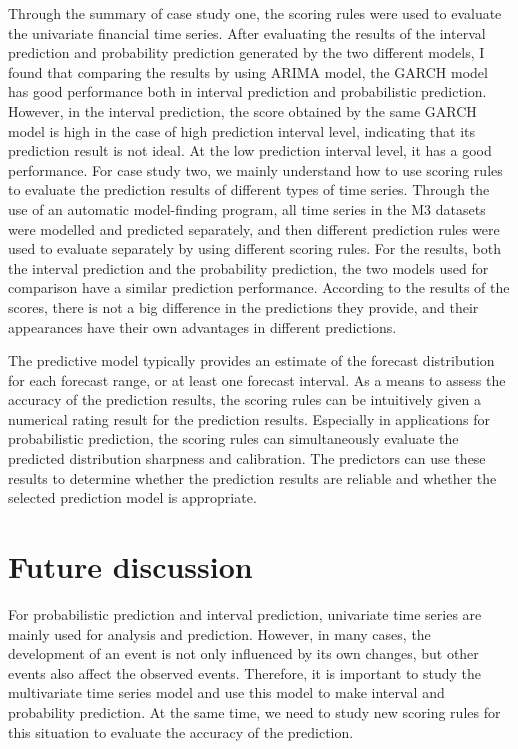 \documentclass{monashthesis}
\theoremstyle{definition}
\theoremstyle{definition}
\theoremstyle{definition}
\theoremstyle{remark}
\begin{document}
Through the summary of case study one, the scoring rules were used to
evaluate the univariate financial time series. After evaluating the
results of the interval prediction and probability prediction generated
by the two different models, I found that comparing the results by using
ARIMA model, the GARCH model has good performance both in interval
prediction and probabilistic prediction. However, in the interval
prediction, the score obtained by the same GARCH model is high in the
case of high prediction interval level, indicating that its prediction
result is not ideal. At the low prediction interval level, it has a good
performance. For case study two, we mainly understand how to use scoring
rules to evaluate the prediction results of different types of time
series. Through the use of an automatic model-finding program, all time
series in the M3 datasets were modelled and predicted separately, and
then different prediction rules were used to evaluate separately by
using different scoring rules. For the results, both the interval
prediction and the probability prediction, the two models used for
comparison have a similar prediction performance. According to the
results of the scores, there is not a big difference in the predictions
they provide, and their appearances have their own advantages in
different predictions.

The predictive model typically provides an estimate of the forecast
distribution for each forecast range, or at least one forecast interval.
As a means to assess the accuracy of the prediction results, the scoring
rules can be intuitively given a numerical rating result for the
prediction results. Especially in applications for probabilistic
prediction, the scoring rules can simultaneously evaluate the predicted
distribution sharpness and calibration. The predictors can use these
results to determine whether the prediction results are reliable and
whether the selected prediction model is appropriate.

\section{Future discussion}\label{future-discussion}

For probabilistic prediction and interval prediction, univariate time
series are mainly used for analysis and prediction. However, in many
cases, the development of an event is not only influenced by its own
changes, but other events also affect the observed events. Therefore, it
is important to study the multivariate time series model and use this
model to make interval and probability prediction. At the same time, we
need to study new scoring rules for this situation to evaluate the
accuracy of the prediction.

\printbibliography[heading=bibintoc]
\end{document}
